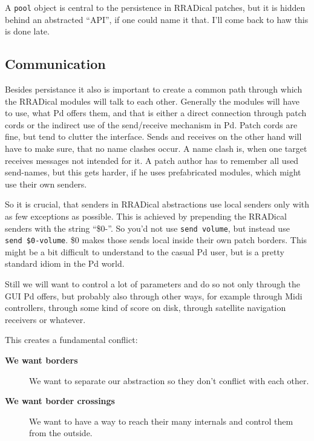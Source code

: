\documentclass[10pt,english]{scrartcl}
\begin{document}
A \texttt{pool} object is central to the persistence in RRADical patches, but it
is hidden behind an abstracted ``API'', if one could name it that. I'll
come back to haw this is done late.



\hypertarget{communication}{}
\subsection*{Communication}

Besides persistance it also is important to create a common path through
which the RRADical modules will talk to each other. Generally the modules
will have to use, what Pd offers them, and that is either a direct
connection through patch cords or the indirect use of the send/receive
mechanism in Pd. Patch cords are fine, but tend to clutter the interface.
Sends and receives on the other hand will have to make sure, that no name
clashes occur. A name clash is, when one target receives messages not
intended for it. A patch author has to remember all used send-names, but
this gets harder, if he uses prefabricated modules, which might use their
own senders.

So it is crucial, that senders in RRADical abstractions use local senders
only with as few exceptions as possible. This is achieved by prepending the
RRADical senders with the string ``{\$}0-''. So you'd not use \texttt{send volume},
but instead use \texttt{send {\$}0-volume}. {\$}0 makes those sends local inside their
own patch borders. This might be a bit difficult to understand to the
casual Pd user, but is a pretty standard idiom in the Pd world.

Still we will want to control a lot of parameters and do so not only
through the GUI Pd offers, but probably also through other ways, for
example through Midi controllers, through some kind of score on disk,
through satellite navigation receivers or whatever.

This creates a fundamental conflict:
\begin{description}
\item[\textbf{We want borders}   ]

We want to separate our abstraction so they don't conflict with each
other.

\item[\textbf{We want border crossings}]

We want to have a way to reach their many internals and control them
from the outside.

\end{description}
\end{document}

